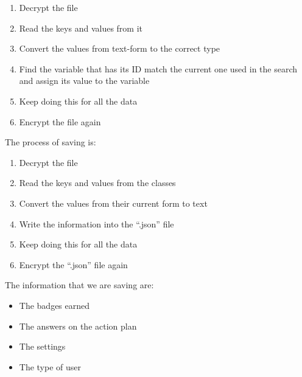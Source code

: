 \begin{enumerate}
    \item{Decrypt the file}
    
    \item{Read the keys and values from it}
    
    \item{Convert the values from text-form to the correct type}
    
    \item{Find the variable that has its ID match the current one used in the search and assign its value to the variable}
    
    \item{Keep doing this for all the data}
    
    \item{Encrypt the file again}
\end{enumerate}
The process of saving is:
\begin{enumerate}
    \item{Decrypt the file}
    
    \item{Read the keys and values from the classes}
    
    \item{Convert the values from their current form to text}
    
    \item{Write the information into the “.json” file}
    
    \item{Keep doing this for all the data}
    
    \item{Encrypt the “.json” file again}
\end{enumerate}
The information that we are saving are:
\begin{itemize}
    \item{The badges earned}
    
    \item{The answers on the action plan}
    
    \item{The settings}
    
    \item{The type of user}
\end{itemize}

